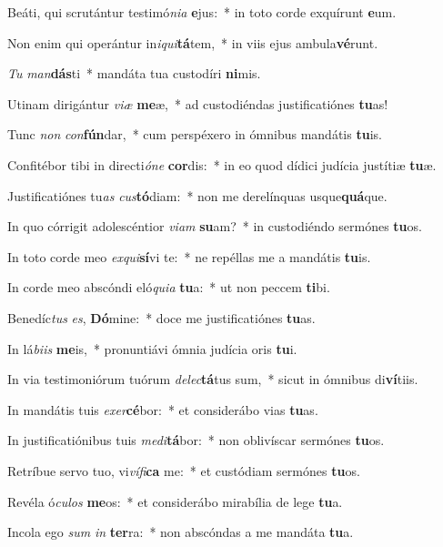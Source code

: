 \item Beáti, qui scrutántur testimó\textit{ni}\textit{a} \textbf{e}jus:~* in toto corde exquírunt \textbf{e}um.
\item Non enim qui operántur in\textit{i}\textit{qui}\textbf{tá}tem,~* in viis ejus ambula\textbf{vé}runt.
\item \textit{Tu} \textit{man}\textbf{dás}ti~* mandáta tua custodíri \textbf{ni}mis.
\item Utinam dirigántur \textit{vi}\textit{æ} \textbf{me}æ,~* ad custodiéndas justificatiónes \textbf{tu}as!
\item Tunc \textit{non} \textit{con}\textbf{fún}dar,~* cum perspéxero in ómnibus mandátis \textbf{tu}is.
\item Confitébor tibi in directi\textit{ó}\textit{ne} \textbf{cor}dis:~* in eo quod dídici judícia justítiæ \textbf{tu}æ.
\item Justificatiónes tu\textit{as} \textit{cus}\textbf{tó}diam:~* non me derelínquas usque\textbf{quá}que.
\item In quo córrigit adolescéntior \textit{vi}\textit{am} \textbf{su}am?~* in custodiéndo sermónes \textbf{tu}os.
\item In toto corde meo \textit{ex}\textit{qui}\textbf{sí}vi te:~* ne repéllas me a mandátis \textbf{tu}is.
\item In corde meo abscóndi eló\textit{qui}\textit{a} \textbf{tu}a:~* ut non peccem \textbf{ti}bi.
\item Benedíc\textit{tus} \textit{es}, \textbf{Dó}mine:~* doce me justificatiónes \textbf{tu}as.
\item In lá\textit{bi}\textit{is} \textbf{me}is,~* pronuntiávi ómnia judícia oris \textbf{tu}i.
\item In via testimoniórum tuórum \textit{de}\textit{lec}\textbf{tá}tus sum,~* sicut in ómnibus di\textbf{ví}tiis.
\item In mandátis tuis \textit{ex}\textit{er}\textbf{cé}bor:~* et considerábo vias \textbf{tu}as.
\item In justificatiónibus tuis \textit{me}\textit{di}\textbf{tá}bor:~* non oblivíscar sermónes \textbf{tu}os.
\item Retríbue servo tuo, vi\textit{ví}\textit{fi}\textbf{ca} me:~* et custódiam sermónes \textbf{tu}os.
\item Revéla ó\textit{cu}\textit{los} \textbf{me}os:~* et considerábo mirabília de lege \textbf{tu}a.
\item Incola ego \textit{sum} \textit{in} \textbf{ter}ra:~* non abscóndas a me mandáta \textbf{tu}a.
